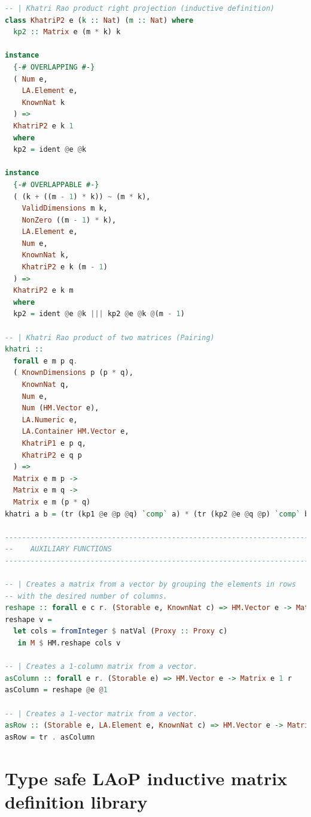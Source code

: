 \documentclass[
  oneside,
  11pt, a4paper,
  footinclude=true,
  headinclude=true,
  cleardoublepage=empty
]{scrbook}
\theoremstyle{definition}
\theoremstyle{definition}
\begin{document}
\begin{lstlisting}[language=Haskell, caption={Type safe matrix wrapper library},captionpos=b]
-- | Khatri Rao product right projection (inductive definition)
class KhatriP2 e (k :: Nat) (m :: Nat) where
  kp2 :: Matrix e (m * k) k

instance
  {-# OVERLAPPING #-}
  ( Num e,
    LA.Element e,
    KnownNat k
  ) =>
  KhatriP2 e k 1
  where
  kp2 = ident @e @k

instance
  {-# OVERLAPPABLE #-}
  ( (k + ((m - 1) * k)) ~ (m * k),
    ValidDimensions m k,
    NonZero ((m - 1) * k),
    LA.Element e,
    Num e,
    KnownNat k,
    KhatriP2 e k (m - 1)
  ) =>
  KhatriP2 e k m
  where
  kp2 = ident @e @k ||| kp2 @e @k @(m - 1)

-- | Khatri Rao product of two matrices (Pairing)
khatri ::
  forall e m p q.
  ( KnownDimensions p (p * q),
    KnownNat q,
    Num e,
    Num (HM.Vector e),
    LA.Numeric e,
    LA.Container HM.Vector e,
    KhatriP1 e p q,
    KhatriP2 e q p
  ) =>
  Matrix e m p ->
  Matrix e m q ->
  Matrix e m (p * q)
khatri a b = (tr (kp1 @e @p @q) `comp` a) * (tr (kp2 @e @q @p) `comp` b)

-------------------------------------------------------------------------------
--    AUXILIARY FUNCTIONS
-------------------------------------------------------------------------------

-- | Creates a matrix from a vector by grouping the elements in rows
-- with the desired number of columns.
reshape :: forall e c r. (Storable e, KnownNat c) => HM.Vector e -> Matrix e c r
reshape v =
  let cols = fromInteger $ natVal (Proxy :: Proxy c)
   in M $ HM.reshape cols v

-- | Creates a 1-column matrix from a vector.
asColumn :: forall e r. (Storable e) => HM.Vector e -> Matrix e 1 r
asColumn = reshape @e @1

-- | Creates a 1-vector matrix from a vector.
asRow :: (Storable e, LA.Element e, KnownNat c) => HM.Vector e -> Matrix e c 1
asRow = tr . asColumn
    \end{lstlisting}
    
	\chapter{Type safe LAoP inductive matrix definition library}\label{appendix-b}
	
\end{document}
